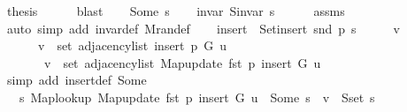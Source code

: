 \begin{isabellebody}
\ {\isacharquery}{\kern0pt}thesis\isanewline
\ \ \ \ \isamarkupfalse%
\ blast\isanewline
{}\isamarkupfalse%
\isanewline
\ \ \isamarkupfalse%
\ {\isacharparenleft}{\kern0pt}Some\ s{\isacharparenright}{\kern0pt}\isanewline
\ \ \isamarkupfalse%
\ invar{\isacharcolon}{\kern0pt}\ {\isachardoublequoteopen}S{\isachardot}{\kern0pt}invar\ s{\isachardoublequoteclose}\isanewline
\ \ \ \ \isamarkupfalse%
\ assms\isanewline
\ \ \ \ \isamarkupfalse%
\ {\isacharparenleft}{\kern0pt}auto\ simp\ add{\isacharcolon}{\kern0pt}\ invar{\isacharunderscore}{\kern0pt}def\ M{\isachardot}{\kern0pt}ran{\isacharunderscore}{\kern0pt}def{\isacharparenright}{\kern0pt}\isanewline
\ \ \isamarkupfalse%
\ {\isacharquery}{\kern0pt}insert\ {\isacharequal}{\kern0pt}\ {\isachardoublequoteopen}Set{\isacharunderscore}{\kern0pt}insert\ {\isacharparenleft}{\kern0pt}snd\ p{\isacharparenright}{\kern0pt}\ s{\isachardoublequoteclose}\isanewline
\ \ \isacommand{{\isacharbraceleft}{\kern0pt}}\isamarkupfalse%
\ \isamarkupfalse%
\ v\isanewline
\ \ \ \ \isamarkupfalse%
\isanewline
\ \ \ \ \ \ {\isachardoublequoteopen}v\ {\isasymin}\ set\ {\isacharparenleft}{\kern0pt}adjacency{\isacharunderscore}{\kern0pt}list\ {\isacharparenleft}{\kern0pt}insert\ p\ G{\isacharparenright}{\kern0pt}\ u{\isacharparenright}{\kern0pt}\ {\isasymlongleftrightarrow}\isanewline
\ \ \ \ \ \ \ v\ {\isasymin}\ set\ {\isacharparenleft}{\kern0pt}adjacency{\isacharunderscore}{\kern0pt}list\ {\isacharparenleft}{\kern0pt}Map{\isacharunderscore}{\kern0pt}update\ {\isacharparenleft}{\kern0pt}fst\ p{\isacharparenright}{\kern0pt}\ {\isacharquery}{\kern0pt}insert\ G{\isacharparenright}{\kern0pt}\ u{\isacharparenright}{\kern0pt}{\isachardoublequoteclose}\isanewline
\ \ \ \ \ \ \isamarkupfalse%
\ {\isacharparenleft}{\kern0pt}simp\ add{\isacharcolon}{\kern0pt}\ insert{\isacharunderscore}{\kern0pt}def\ Some{\isacharparenright}{\kern0pt}\isanewline
\ \ \ \ \isamarkupfalse%
\ \isamarkupfalse%
\ {\isachardoublequoteopen}{\isachardot}{\kern0pt}{\isachardot}{\kern0pt}{\isachardot}{\kern0pt}\ {\isasymlongleftrightarrow}\ {\isacharparenleft}{\kern0pt}{\isasymexists}s{\isachardot}{\kern0pt}\ Map{\isacharunderscore}{\kern0pt}lookup\ {\isacharparenleft}{\kern0pt}Map{\isacharunderscore}{\kern0pt}update\ {\isacharparenleft}{\kern0pt}fst\ p{\isacharparenright}{\kern0pt}\ {\isacharquery}{\kern0pt}insert\ G{\isacharparenright}{\kern0pt}\ u\ {\isacharequal}{\kern0pt}\ Some\ s\ {\isasymand}\ v\ {\isasymin}\ S{\isachardot}{\kern0pt}set\ s{\isacharparenright}{\kern0pt}{\isachardoublequoteclose}\isanewline

\end{isabellebody}
